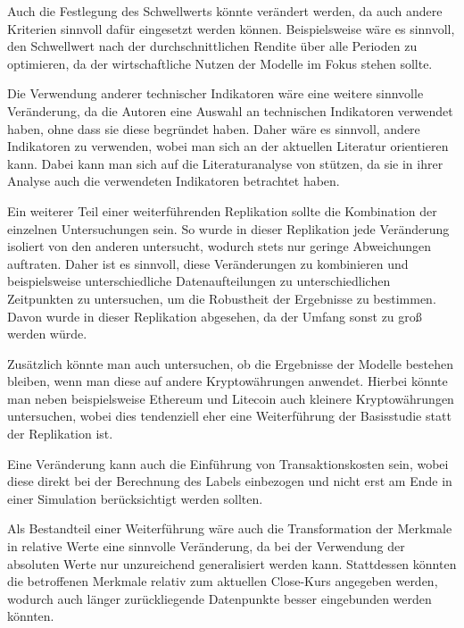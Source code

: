 \documentclass[a4paper, 12pt]{article}
\begin{document}
Auch die Festlegung des Schwellwerts könnte verändert werden, da auch andere Kriterien sinnvoll dafür eingesetzt werden können.
Beispielsweise wäre es sinnvoll, den Schwellwert nach der durchschnittlichen Rendite über alle Perioden zu optimieren, da der wirtschaftliche Nutzen der Modelle im Fokus stehen sollte.

Die Verwendung anderer technischer Indikatoren wäre eine weitere sinnvolle Veränderung, da die Autoren eine Auswahl an technischen Indikatoren verwendet haben, ohne dass sie diese begründet haben.
Daher wäre es sinnvoll, andere Indikatoren zu verwenden, wobei man sich an der aktuellen Literatur orientieren kann.
Dabei kann man sich auf die Literaturanalyse von \textcite{AyiteyJunior2023} stützen, da sie in ihrer Analyse auch die verwendeten Indikatoren betrachtet haben.

Ein weiterer Teil einer weiterführenden Replikation sollte die Kombination der einzelnen Untersuchungen sein.
So wurde in dieser Replikation jede Veränderung isoliert von den anderen untersucht, wodurch stets nur geringe Abweichungen auftraten.
Daher ist es sinnvoll, diese Veränderungen zu kombinieren und beispielsweise unterschiedliche Datenaufteilungen zu unterschiedlichen Zeitpunkten zu untersuchen, um die Robustheit der Ergebnisse zu bestimmen.
Davon wurde in dieser Replikation abgesehen, da der Umfang sonst zu groß werden würde.
\vspace{\baselineskip}

Zusätzlich könnte man auch untersuchen, ob die Ergebnisse der Modelle bestehen bleiben, wenn man diese auf andere Kryptowährungen anwendet.
Hierbei könnte man neben beispielsweise Ethereum und Litecoin auch kleinere Kryptowährungen untersuchen, wobei dies tendenziell eher eine Weiterführung der Basisstudie statt der Replikation ist.

Eine Veränderung kann auch die Einführung von Transaktionskosten sein, wobei diese direkt bei der Berechnung des Labels einbezogen und nicht erst am Ende in einer Simulation berücksichtigt werden sollten.

Als Bestandteil einer Weiterführung wäre auch die Transformation der Merkmale in relative Werte eine sinnvolle Veränderung, da bei der Verwendung der absoluten Werte nur unzureichend generalisiert werden kann.
Stattdessen könnten die betroffenen Merkmale relativ zum aktuellen Close-Kurs angegeben werden, wodurch auch länger zurückliegende Datenpunkte besser eingebunden werden könnten.
\vspace{\baselineskip}
\end{document}
